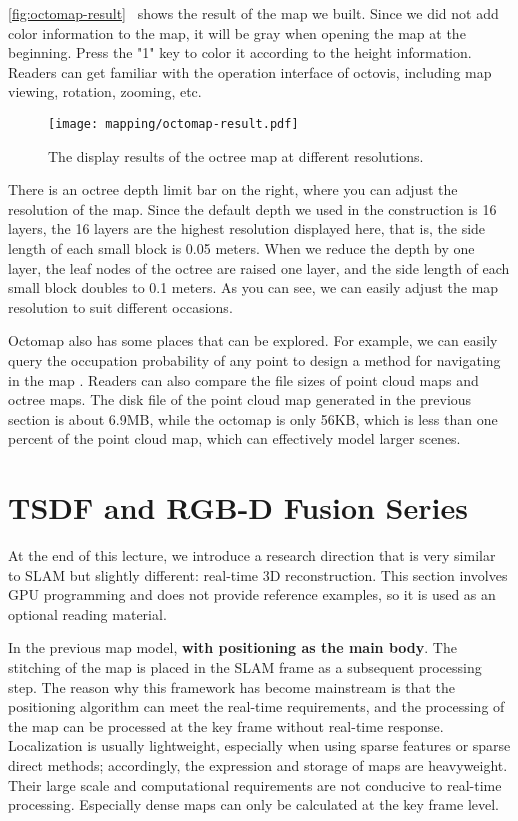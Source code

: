 \autoref{fig:octomap-result}~ shows the result of the map we built. Since we did not add color information to the map, it will be gray when opening the map at the beginning. Press the "1" key to color it according to the height information. Readers can get familiar with the operation interface of octovis, including map viewing, rotation, zooming, etc.

\begin{figure}[!htp]
	\centering
	\texttt{[image: mapping/octomap-result.pdf]}
	\caption{The display results of the octree map at different resolutions.}
	\label{fig:octomap-result}
\end{figure}

There is an octree depth limit bar on the right, where you can adjust the resolution of the map. Since the default depth we used in the construction is 16 layers, the 16 layers are the highest resolution displayed here, that is, the side length of each small block is 0.05 meters. When we reduce the depth by one layer, the leaf nodes of the octree are raised one layer, and the side length of each small block doubles to 0.1 meters. As you can see, we can easily adjust the map resolution to suit different occasions.

Octomap also has some places that can be explored. For example, we can easily query the occupation probability of any point to design a method for navigating in the map {\cite{Burri2015}}. Readers can also compare the file sizes of point cloud maps and octree maps. The disk file of the point cloud map generated in the previous section is about 6.9MB, while the octomap is only 56KB, which is less than one percent of the point cloud map, which can effectively model larger scenes.


\section{\textsuperscript{\ttfamily *} TSDF and RGB-D Fusion Series}
At the end of this lecture, we introduce a research direction that is very similar to SLAM but slightly different: real-time 3D reconstruction. This section involves GPU programming and does not provide reference examples, so it is used as an optional reading material.

In the previous map model, \textbf{with positioning as the main body}. The stitching of the map is placed in the SLAM frame as a subsequent processing step. The reason why this framework has become mainstream is that the positioning algorithm can meet the real-time requirements, and the processing of the map can be processed at the key frame without real-time response. Localization is usually lightweight, especially when using sparse features or sparse direct methods; accordingly, the expression and storage of maps are heavyweight. Their large scale and computational requirements are not conducive to real-time processing. Especially dense maps can only be calculated at the key frame level.


